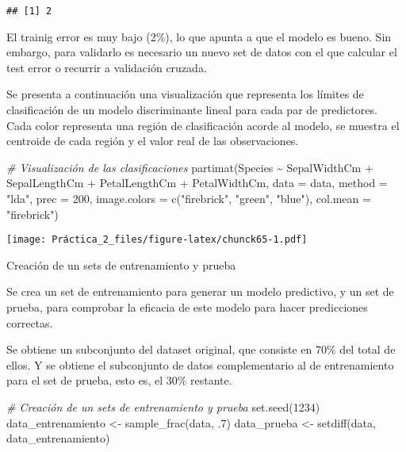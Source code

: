 \documentclass[
]{article}
\newenvironment{Shaded}{\begin{snugshade}}{\end{snugshade}}
\newcommand{\AttributeTok}[1]{\textcolor[rgb]{0.77,0.63,0.00}{#1}}
\newcommand{\CommentTok}[1]{\textcolor[rgb]{0.56,0.35,0.01}{\textit{#1}}}
\newcommand{\DecValTok}[1]{\textcolor[rgb]{0.00,0.00,0.81}{#1}}
\newcommand{\FunctionTok}[1]{\textcolor[rgb]{0.00,0.00,0.00}{#1}}
\newcommand{\NormalTok}[1]{#1}
\newcommand{\OtherTok}[1]{\textcolor[rgb]{0.56,0.35,0.01}{#1}}
\newcommand{\SpecialCharTok}[1]{\textcolor[rgb]{0.00,0.00,0.00}{#1}}
\newcommand{\StringTok}[1]{\textcolor[rgb]{0.31,0.60,0.02}{#1}}
\begin{document}
\begin{verbatim}
## [1] 2
\end{verbatim}

El trainig error es muy bajo (2\%), lo que apunta a que el modelo es
bueno. Sin embargo, para validarlo es necesario un nuevo set de datos
con el que calcular el test error o recurrir a validación cruzada.

Se presenta a continuación una visualización que representa los límites
de clasificación de un modelo discriminante lineal para cada par de
predictores. Cada color representa una región de clasificación acorde al
modelo, se muestra el centroide de cada región y el valor real de las
observaciones.

\begin{Shaded}
\begin{Highlighting}[]
\CommentTok{\# Visualización de las clasificaciones}
\FunctionTok{partimat}\NormalTok{(Species }\SpecialCharTok{\textasciitilde{}}\NormalTok{ SepalWidthCm }\SpecialCharTok{+}\NormalTok{ SepalLengthCm }\SpecialCharTok{+}\NormalTok{ PetalLengthCm }\SpecialCharTok{+}\NormalTok{ PetalWidthCm,}
         \AttributeTok{data =}\NormalTok{ data, }\AttributeTok{method =} \StringTok{"lda"}\NormalTok{, }\AttributeTok{prec =} \DecValTok{200}\NormalTok{,}
         \AttributeTok{image.colors =} \FunctionTok{c}\NormalTok{(}\StringTok{"firebrick"}\NormalTok{, }\StringTok{"green"}\NormalTok{, }\StringTok{"blue"}\NormalTok{),}
         \AttributeTok{col.mean =} \StringTok{"firebrick"}\NormalTok{)}
\end{Highlighting}
\end{Shaded}

\texttt{[image: Práctica\_2\_files/figure-latex/chunck65-1.pdf]}

Creación de un sets de entrenamiento y prueba

Se crea un set de entrenamiento para generar un modelo predictivo, y un
set de prueba, para comprobar la eficacia de este modelo para hacer
predicciones correctas.

Se obtiene un subconjunto del dataset original, que consiste en 70\% del
total de ellos. Y se obtiene el subconjunto de datos complementario al
de entrenamiento para el set de prueba, esto es, el 30\% restante.

\begin{Shaded}
\begin{Highlighting}[]
\CommentTok{\# Creación de un sets de entrenamiento y prueba}
\FunctionTok{set.seed}\NormalTok{(}\DecValTok{1234}\NormalTok{)}
\NormalTok{data\_entrenamiento }\OtherTok{\textless{}{-}} \FunctionTok{sample\_frac}\NormalTok{(data, .}\DecValTok{7}\NormalTok{)}
\NormalTok{data\_prueba }\OtherTok{\textless{}{-}} \FunctionTok{setdiff}\NormalTok{(data, data\_entrenamiento)}
\end{Highlighting}
\end{Shaded}
\end{document}
